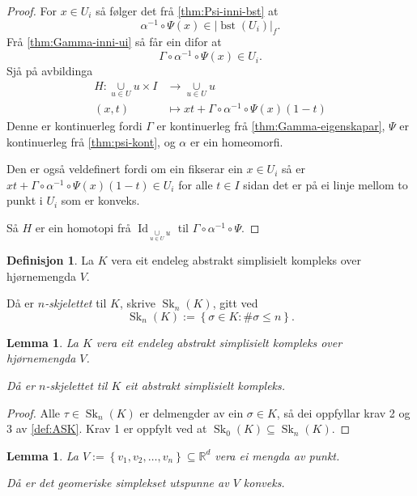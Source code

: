 \documentclass[a4paper, 12pt, norsk]{article}
\theoremstyle{plain}
\newtheorem{lemma}[theorem]{Lemma}
\theoremstyle{definition}
\newtheorem{definition}[theorem]{Definisjon}
\newcommand{\Rb}{\mathbb{R}}
\newcommand{\union}{ \mathop{\cup}\limits }
\newcommand{\gr}[1]{ \lvert #1 \rvert } %
\newcommand{\set}[1]{ \left\{ #1 \right\} } %
\newcommand{\tuple}[1]{ \left( #1 \right) } %
\DeclareMathOperator{\bst}{bst} %
\DeclareMathOperator{\Sk}{Sk} %
\DeclareMathOperator{\Id}{Id} %
\begin{document}
\begin{proof}
	For \( x \in U_i \) så følger det frå \autoref{thm:Psi-inni-bst} at
	\[
		\alpha^{-1} \circ \Psi(x) \in \gr{\bst(U_i)}_f.
	\]
	Frå \autoref{thm:Gamma-inni-ui} så får ein difor at
	\[
		\Gamma \circ \alpha^{-1} \circ \Psi(x) \in U_i.
	\]
	Sjå på avbildinga
	\begin{align*}
		H: \union_{u \in U} u \times I &\to \union_{u \in U} u \\
		\tuple{x, t} &\mapsto xt + \Gamma \circ \alpha^{-1} \circ \Psi(x)(1-t)
	\end{align*}
	Denne er kontinuerleg fordi \( \Gamma \) er kontinuerleg frå \autoref{thm:Gamma-eigenskapar}, \( \Psi \) er kontinuerleg frå \autoref{thm:psi-kont}, og \( \alpha \) er ein homeomorfi.
	
	Den er også veldefinert fordi om ein fikserar ein \( x \in U_i \) så er \( xt + \Gamma \circ \alpha^{-1} \circ \Psi(x)(1-t) \in U_i \) for alle \( t \in I \) sidan det er på ei linje mellom to punkt i \( U_i \) som er konveks.

	Så \( H \) er ein homotopi frå \( \Id_{\union_{u \in U} u} \) til \( \Gamma \circ \alpha^{-1} \circ \Psi \).
\end{proof}

\begin{definition}
	La \( K \) vera eit endeleg abstrakt simplisielt kompleks over hjørnemengda \( V \). 
	
	Då er \emph{\( n \)-skjelettet} til \( K \), skrive \( \Sk_n(K) \), gitt ved
	\[
		\Sk_n(K) := \set{\sigma \in K : \#\sigma \leq n}.
	\]
\end{definition}

\begin{lemma}
	La \( K \) vera eit endeleg abstrakt simplisielt kompleks over hjørnemengda \( V \). 
	
	Då er \( n \)-skjelettet til \( K \) eit abstrakt simplisielt kompleks.
\end{lemma}

\begin{proof}
	Alle \( \tau \in \Sk_n(K) \) er delmengder av ein \( \sigma \in K \), så dei oppfyllar krav 2 og 3 av \autoref{def:ASK}. Krav 1 er oppfylt ved at \( \Sk_0(K) \subseteq \Sk_n(K) \).
\end{proof}

\begin{lemma} \label{thm:konveks-kombinasjon-er-konveks}
	La \( V := \set{v_1, v_2, \dots, v_n} \subseteq \Rb^d \) vera ei mengda av punkt.
	
	Då er det geomeriske simplekset utspunne av \( V \) konveks.
\end{lemma}
\end{document}
